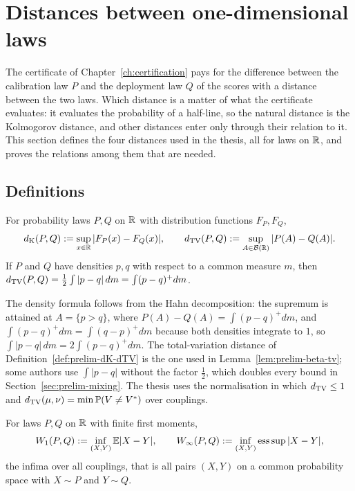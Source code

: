\documentclass[../../../main.tex]{subfiles}
\begin{document}
\section{Distances between one-dimensional laws}\label{sec:prelim-distances}

The certificate of Chapter~\ref{ch:certification} pays for the difference between the calibration law $P$ and the deployment law $Q$ of the scores with a distance between the two laws. Which distance is a matter of what the certificate evaluates: it evaluates the probability of a half-line, so the natural distance is the Kolmogorov distance, and other distances enter only through their relation to it. This section defines the four distances used in the thesis, all for laws on $\mathbb{R}$, and proves the relations among them that are needed.

\subsection{Definitions}

\begin{definition}\label{def:prelim-dK-dTV}
For probability laws $P,Q$ on $\mathbb{R}$ with distribution functions $F_P,F_Q$,
\[
d_{\mathrm{K}}(P,Q):=\sup_{x\in\mathbb{R}}|F_P(x)-F_Q(x)|,\qquad
d_{\mathrm{TV}}(P,Q):=\sup_{A\in\mathcal B(\mathbb{R})}|P(A)-Q(A)| .
\]
If $P$ and $Q$ have densities $p,q$ with respect to a common measure $m$, then $d_{\mathrm{TV}}(P,Q)=\tfrac12\int|p-q|\,dm=\int(p-q)^+dm$.
\end{definition}

The density formula follows from the Hahn decomposition: the supremum is attained at $A=\{p>q\}$, where $P(A)-Q(A)=\int(p-q)^+dm$, and $\int(p-q)^+dm=\int(q-p)^+dm$ because both densities integrate to $1$, so $\int|p-q|\,dm=2\int(p-q)^+dm$. The total-variation distance of Definition~\ref{def:prelim-dK-dTV} is the one used in Lemma~\ref{lem:prelim-beta-tv}; some authors use $\int|p-q|$ without the factor $\tfrac12$, which doubles every bound in Section~\ref{sec:prelim-mixing}. The thesis uses the normalisation in which $d_{\mathrm{TV}}\le1$ and $d_{\mathrm{TV}}(\mu,\nu)=\min\mathbb{P}(V\ne V^*)$ over couplings.

\begin{definition}\label{def:prelim-W}
For laws $P,Q$ on $\mathbb{R}$ with finite first moments,
\[
W_1(P,Q):=\inf_{(X,Y)}\mathbb{E}|X-Y|,\qquad W_\infty(P,Q):=\inf_{(X,Y)}\operatorname*{ess\,sup}|X-Y|,
\]
the infima over all couplings, that is all pairs $(X,Y)$ on a common probability space with $X\sim P$ and $Y\sim Q$.
\end{definition}
\end{document}
